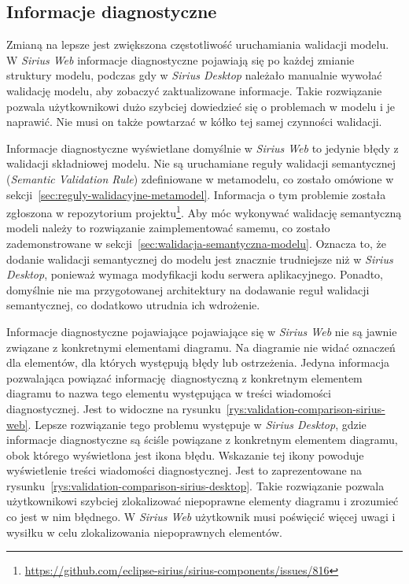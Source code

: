 \subsection{Informacje diagnostyczne}

Zmianą na lepsze jest zwiększona częstotliwość uruchamiania walidacji
modelu. W \emph{Sirius Web} informacje diagnostyczne pojawiają się po każdej
zmianie struktury modelu, podczas gdy w \emph{Sirius Desktop} należało
manualnie wywołać walidację modelu, aby zobaczyć zaktualizowane informacje.
Takie rozwiązanie pozwala użytkownikowi dużo szybciej dowiedzieć się o
problemach w modelu i je naprawić. Nie musi on także powtarzać w kółko tej
samej czynności walidacji.

Informacje diagnostyczne wyświetlane domyślnie w \emph{Sirius Web} to jedynie
błędy z walidacji składniowej modelu. Nie są uruchamiane reguły walidacji
semantycznej (\emph{Semantic Validation Rule}) zdefiniowane w metamodelu, co
zostało omówione w sekcji~\ref{sec:reguly-walidacyjne-metamodel}. Informacja o
tym problemie została zgłoszona w repozytorium projektu\footnote{
	\url{https://github.com/eclipse-sirius/sirius-components/issues/816}}.
Aby móc wykonywać walidację semantyczną modeli należy to rozwiązanie
zaimplementować samemu, co zostało zademonstrowane w
sekcji~\ref{sec:walidacja-semantyczna-modelu}.
Oznacza to, że dodanie walidacji semantycznej do modelu jest znacznie
trudniejsze niż w \emph{Sirius Desktop}, ponieważ wymaga modyfikacji kodu
serwera aplikacyjnego. Ponadto, domyślnie nie ma przygotowanej architektury na
dodawanie reguł walidacji semantycznej, co dodatkowo utrudnia ich wdrożenie.

Informacje diagnostyczne pojawiające pojawiające się w \emph{Sirius Web} nie są
jawnie związane z konkretnymi elementami diagramu. Na diagramie nie widać
oznaczeń dla elementów, dla których występują błędy lub ostrzeżenia. Jedyna
informacja pozwalająca powiązać informację diagnostyczną z konkretnym elementem
diagramu to nazwa tego elementu występująca w treści wiadomości diagnostycznej.
Jest to widoczne na rysunku~\ref{rys:validation-comparison-sirius-web}. Lepsze
rozwiązanie tego problemu występuje w
\emph{Sirius Desktop}, gdzie informacje diagnostyczne są ściśle powiązane z
konkretnym elementem diagramu, obok którego wyświetlona jest ikona błędu.
Wskazanie tej ikony powoduje wyświetlenie treści wiadomości diagnostycznej.
Jest to zaprezentowane na
rysunku~\ref{rys:validation-comparison-sirius-desktop}.
Takie rozwiązanie pozwala użytkownikowi szybciej zlokalizować niepoprawne
elementy diagramu i zrozumieć co jest w nim błędnego. W \emph{Sirius Web}
użytkownik musi poświęcić więcej uwagi i wysiłku w celu zlokalizowania
niepoprawnych elementów.

